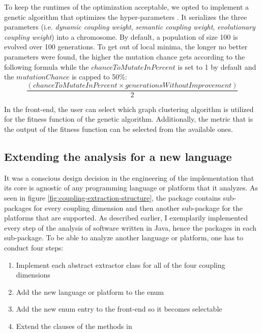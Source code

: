 \documentclass[12pt,a4paper]{report}
\begin{document}
To keep the runtimes of the optimization acceptable, we opted to implement a
genetic algorithm that optimizes the hyper\hyp parameters \cn.
It serializes the three parameters (i.e. \textit{dynamic coupling weight},
\textit{semantic coupling weight}, \textit{evolutionary coupling weight}) into
a chromosome. By default, a population of size 100 is evolved over 100 generations.
To get out of local minima, the longer no better parameters were found, the higher
the mutation chance gets according to the following formula while the
$chanceToMutateInPercent$ is set to 1 by default and the $mutationChance$
is capped to 50\%:
\[
  \frac{(chanceToMutateInPercent \times generationsWithoutImprovement)}{2}
\]

In the front\hyp end, the user can select which graph clustering algorithm is
utilized for the fitness function of the genetic algorithm.
Additionally, the metric that is the output of the fitness function can be
selected from the available ones.


\subsection{Extending the analysis for a new language}

It was a conscious design decision in the engineering of the implementation that its core
is agnostic of any programming language or platform that it analyzes.
As seen in figure \ref{fig:coupling-extraction-structure}, the 
package contains sub\hyp packages for every coupling dimension and then another sub\hyp package
for the platforms that are supported. As described earlier, I exemplarily implemented every step
of the analysis of software written in Java, hence the  packages in each
 sub\hyp package.
To be able to analyze another language or platform, one has to conduct four steps:
\begin{enumerate}
    \item Implement each abstract extractor class for all of the four coupling dimensions
    \item Add the new language or platform to the  enum
    \item Add the new enum entry to the front-end so it becomes selectable
    \item Extend the clauses of the methods in 
\end{enumerate}
\end{document}
